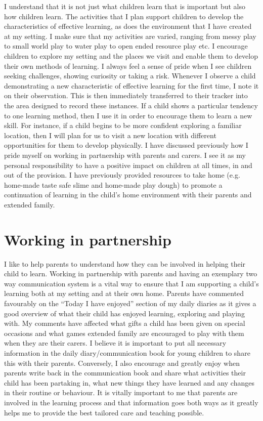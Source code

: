 \documentclass[10pt,a4paper]{report}
\begin{document}
I understand that it is not just what children learn that is important but also how children learn. The activities that I plan support children to develop the characteristics of effective learning, as does the environment that I have created at my setting. I make sure that my activities are varied, ranging from messy play to small world play to water play to open ended resource play etc. I encourage children to explore my setting and the places we visit and enable them to develop their own methods of learning. I always feel a sense of pride when I see children seeking challenges, showing curiosity or taking a risk. Whenever I observe a child demonstrating a new characteristic of effective learning for the first time, I note it on their observation. This is then immediately transferred to their tracker into the area designed to record these instances. If a child shows a particular tendency to one learning method, then I use it in order to encourage them to learn a new skill. For instance, if a child begins to be more confident exploring a familiar location, then I will plan for us to visit a new location with different opportunities for them to develop physically.
I have discussed previously how I pride myself on working in partnership with parents and carers. 
I see it as my personal responsibility to have a positive impact on children at all times, in and out of the provision. I have previously provided resources to take home (e.g. home-made taste safe slime and home-made play dough) to promote a continuation of learning in the child's home environment with their parents and extended family.

\section{Working in partnership}

I like to help parents to understand how they can be involved in helping their child to learn. Working in partnership with parents and having an exemplary two way communication system is a vital way to ensure that I am supporting a child's learning both at my setting and at their own home. Parents have commented favourably on the “Today I have enjoyed” section of my daily diaries as it gives a good overview of what their child has enjoyed learning, exploring and playing with. My comments have affected what gifts a child has been given on special occasions and what games extended family are encouraged to play with them when they are their carers. I believe it is important to put all necessary information in the daily diary/communication book for young children to share this with their parents. Conversely, I also encourage and greatly enjoy when parents write back in the communication book and share what activities their child has been partaking in, what new things they have learned and any changes in their routine or behaviour. It is vitally important to me that parents are involved in the learning process and that information goes both ways as it greatly helps me to provide the best tailored care and teaching possible. 
\end{document}
